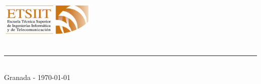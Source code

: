 \begin{titlepage}
\begin{minipage}{\textwidth}
    \end{minipage}
    
    
        
    \begin{minipage}{\textwidth}
        \centering
        \vspace*{2.6cm}
        \includegraphics[width=0.35\textwidth]{assets/images/portada/etsiit_logo.png}\\[0.2cm]
        \textsc{\etsiitname} \\
        \rule{25mm}{0.15mm}\\[0.1cm]
        Granada - \today
    \end{minipage}


\end{titlepage}

\clearpage
\newpage
\mbox{}
\clearpage
\newpage